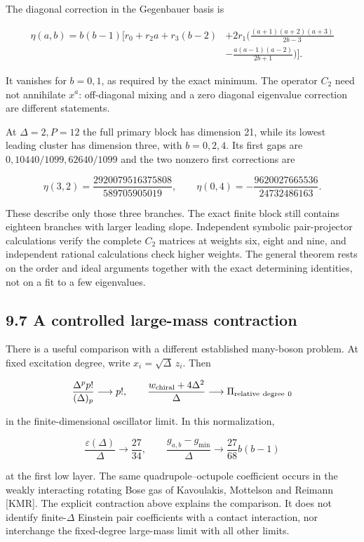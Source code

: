 \documentclass[a4paper,11pt]{article}
\numberwithin{equation}{section}
\begin{document}
The diagonal correction in the Gegenbauer basis is

\[
\begin{aligned}
\eta(a,b)=b(b-1)\bigg[
r_0+r_2a+r_3(b-2)
&+2r_1\bigg(
\frac{(a+1)(a+2)(a+3)}{2b-3}\\
&-\frac{a(a-1)(a-2)}{2b+1}
\bigg)\bigg].
\end{aligned}
\]

It vanishes for \(b=0,1\), as required by the exact minimum. The operator \(C_2\) need not annihilate \(x^a\): off-diagonal mixing and a zero diagonal eigenvalue correction are different statements.

At \(\Delta=2,P=12\) the full primary block has dimension 21, while its lowest leading cluster has dimension three, with \(b=0,2,4\). Its first gaps are \(0,10440/1099,62640/1099\) and the two nonzero first corrections are

\[
\eta(3,2)=\frac{2920079516375808}{589705905019},\qquad
\eta(0,4)=-\frac{9620027665536}{24732486163}.
\]

These describe only those three branches. The exact finite block still contains eighteen branches with larger leading slope. Independent symbolic pair-projector calculations verify the complete \(C_2\) matrices at weights six, eight and nine, and independent rational calculations check higher weights. The general theorem rests on the order and ideal arguments together with the exact determining identities, not on a fit to a few eigenvalues.

\hypertarget{a-controlled-large-mass-contraction}{%
\subsection{9.7 A controlled large-mass contraction}\label{a-controlled-large-mass-contraction}}

There is a useful comparison with a different established many-boson problem. At fixed excitation degree, write \(x_i=\sqrt{\Delta}\,z_i\). Then

\[
\frac{\Delta^p p!}{(\Delta)_p}\longrightarrow p!,
\qquad
\frac{w_{\rm chiral}+4\Delta^2}{\Delta}
\longrightarrow \Pi_{\rm relative\ degree\ 0}
\]

in the finite-dimensional oscillator limit. In this normalization,

\[
\frac{\varepsilon(\Delta)}{\Delta}\longrightarrow\frac{27}{34},
\qquad
\frac{g_{a,b}-g_{\min}}{\Delta}
\longrightarrow\frac{27}{68}b(b-1)
\]

at the first low layer. The same quadrupole--octupole coefficient occurs in the weakly interacting rotating Bose gas of Kavoulakis, Mottelson and Reimann {[}KMR{]}. The explicit contraction above explains the comparison. It does not identify finite-\(\Delta\) Einstein pair coefficients with a contact interaction, nor interchange the fixed-degree large-mass limit with all other limits.
\end{document}
